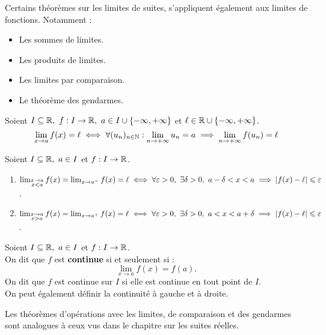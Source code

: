 \begin{remark}
	Certains théorèmes sur les limites de suites, s'appliquent également aux limites de fonctions. Notamment :
	\begin{itemize}
		\item Les sommes de limites.
		\item Les produits de limites.
		\item Les limites par comparaison.
		\item Le théorème des gendarmes.
	\end{itemize}
\end{remark}

\begin{theorem}
	Soient $I \subseteq \mathbb{R},\ f : I \to \mathbb{R},\ a \in I \cup \{-\infty, +\infty\}$ et $\ell \in \mathbb{R} \cup \{-\infty, +\infty\}$.
	\[ \lim_{x \to a} f(x) = \ell \iff \forall (u_n)_{n \in \mathbb{N}} : \lim_{n \to +\infty} u_n = a \implies \lim_{n \to +\infty} f(u_n) = \ell \]
\end{theorem}

\begin{definition}
    Soient $I \subseteq \mathbb{R},\ a \in I$ et $f : I \to \mathbb{R} $.
    \begin{enumerate}
        \item $ \lim_{\substack{x \to a \\ x < a}} f(x) = \lim_{x \to a^-} f(x) = \ell \iff \forall \varepsilon > 0,\ \exists \delta > 0,\ a - \delta < x < a \implies \abs{f(x) - \ell} \leq \varepsilon $.
        \item $\lim_{\substack{x \to a \\ x > a}} f(x) = \lim_{x \to a^+} f(x) = \ell \iff \forall \varepsilon > 0,\ \exists \delta > 0,\ a < x < a + \delta \implies \abs{f(x) - \ell} \leq \varepsilon$.
    \end{enumerate}
\end{definition}

\begin{definition}[Continuité]
	Soient $I \subseteq \mathbb{R},\ a \in I$ et $f : I \to \mathbb{R}$.
        \\ 
        On dit que $f$ est \textbf{continue} si et seulement si :
        \[\lim_{x \to a} f(x) = f(a).\] 
	On dit que $f$ est continue sur $I$ si elle est continue en tout point de $I$.\\
	On peut également définir la continuité à gauche et à droite.
\end{definition}

\begin{remark}
	Les théorèmes d'opérations avec les limites, de comparaison et des gendarmes sont analogues à ceux vus  dans le chapitre sur les suites réelles.
\end{remark}


